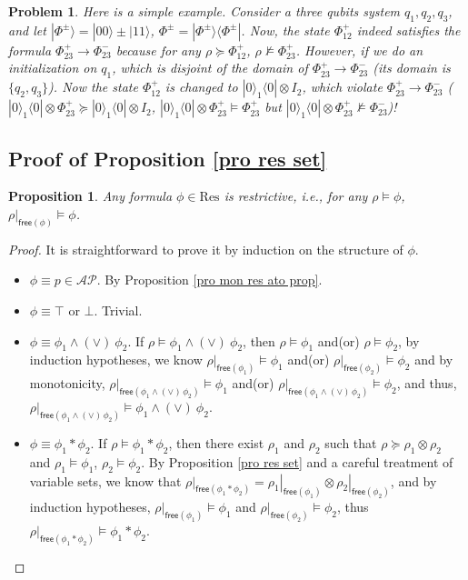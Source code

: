 \documentclass[conference,compsoc, 10pt]{IEEEtran}
\newtheorem{proposition}{Proposition}[section]
\newtheorem{problem}{Problem}[section]
\newcommand {\free }[1] {{\mathsf{free}\left(#1\right)}}
\newcommand {\res} {{\mathrm{Res}}}
\newcommand {\rt }[2] {{\left.{#1}\right|_{#2}}}
\newcommand {\AP} {{\mathcal{AP}}}
\def\>{\ensuremath{\rangle}}
\def\<{\ensuremath{\langle}}
\begin{document}
\begin{appendices}
\begin{problem}
			Here is a simple example. Consider a three qubits system $q_1,q_2,q_3$, and let $|\Phi^\pm\> = |00\>\pm|11\>$, $\Phi^\pm = |\Phi^\pm\>\<\Phi^\pm|$. Now, the state $\Phi^+_{12}$ indeed satisfies the formula $\Phi^+_{23}\rightarrow\Phi^-_{23}$ because for any $\rho\succeq\Phi^+_{12}$, $\rho\not\models\Phi^+_{23}$. However, if we do an initialization on $q_1$, which is disjoint of the domain of $\Phi^+_{23}\rightarrow\Phi^-_{23}$ (its domain is $\{q_2,q_3\}$). Now the state $\Phi^+_{12}$ is changed to $|0\>_1\<0|\otimes I_2$, which violate $\Phi^+_{23}\rightarrow\Phi^-_{23}$ ($|0\>_1\<0|\otimes\Phi^+_{23} \succeq|0\>_1\<0|\otimes I_2$, $|0\>_1\<0|\otimes\Phi^+_{23}\models\Phi^+_{23}$ but $|0\>_1\<0|\otimes\Phi^+_{23}\not\models\Phi^-_{23}$)!
		\end{problem}
		
		
		\subsection{Proof of Proposition \ref{pro res set}}
		
		\begin{proposition}
			Any formula $\phi\in\res$ is restrictive, i.e., for any $\rho\models\phi$, $\rt{\rho}{\free{\phi}}\models\phi$.
		\end{proposition}
		\begin{proof}
			It is straightforward to prove it by induction on the structure of $\phi$.
			\begin{itemize}
				\item $\phi\equiv p\in\AP$. By Proposition \ref{pro mon res ato prop}.
				\item $\phi \equiv \top$ or $\bot$. Trivial.
				\item $\phi\equiv \phi_1\wedge (\vee)\ \phi_2$. If $\rho\models\phi_1\wedge (\vee)\ \phi_2$, then $\rho\models\phi_1$ and(or) $\rho\models\phi_2$, by induction hypotheses, we know $\rt{\rho}{\free{\phi_1}}\models\phi_1$ and(or) $\rt{\rho}{\free{\phi_2}}\models\phi_2$ and by monotonicity, $\rt{\rho}{\free{\phi_1\wedge (\vee)\, \phi_2}}\models\phi_1$ and(or) $\rt{\rho}{\free{\phi_1\wedge (\vee)\, \phi_2}}\models\phi_2$, and thus, $\rt{\rho}{\free{\phi_1\wedge (\vee)\, \phi_2}}\models\phi_1\wedge (\vee)\ \phi_2$.
				\item $\phi\equiv \phi_1\ast \phi_2$. If $\rho\models\phi_1\ast \phi_2$, then there exist $\rho_1$ and $\rho_2$ such that $\rho\succeq\rho_1\otimes\rho_2$ and $\rho_1\models\phi_1$, $\rho_2\models\phi_2$. By Proposition \ref{pro res set} and a careful treatment of variable sets, we know that $\rt{\rho}{\free{\phi_1\ast \phi_2}} = \rt{\rho_1}{\free{\phi_1}}\otimes \rt{\rho_2}{\free{\phi_2}}$, and by induction hypotheses, $\rt{\rho}{\free{\phi_1}}\models\phi_1$ and $\rt{\rho}{\free{\phi_2}}\models\phi_2$, thus $\rt{\rho}{\free{\phi_1\ast \phi_2}}\models\phi_1\ast \phi_2$.
			\end{itemize}
		\end{proof}
		

\end{appendices}
\end{document}
